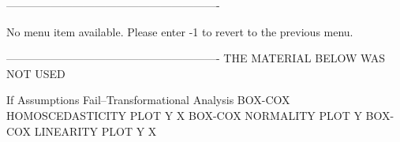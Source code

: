  
 
 
 
 
 
 
 
 
 
 
 
 
 
 
 
 
 
 
 
 
 
 
 
 
 
 
 
 
 
 
 
 
 
 
 
 
 
 
 
 
 
 
 
 
 
 
 
 
 
----------------------------------------------------------
 
No menu item available.
Please enter -1 to revert
to the previous menu.
 
 
 
 
 
 
 
 
 
 
 
 
 
 
 
 
 
 
 
 
 
 
 
 
 
 
 
 
 
 
 
 
 
 
 
 
 
 
 
 
 
 
 
 
 
 
 
 
 
----------------------------------------------------------
THE MATERIAL BELOW WAS NOT USED
 
If Assumptions Fail--Transformational Analysis
   BOX-COX HOMOSCEDASTICITY PLOT Y X
   BOX-COX NORMALITY PLOT Y
   BOX-COX LINEARITY PLOT Y X
 
